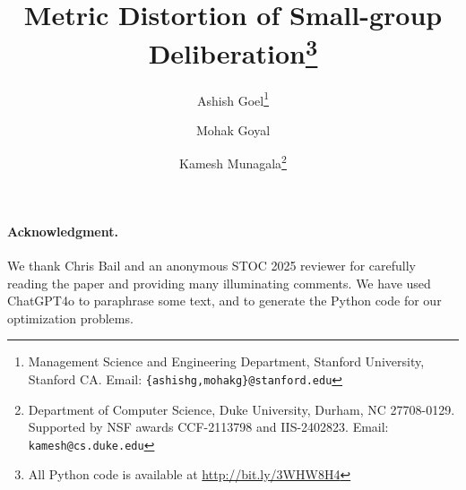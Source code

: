 \documentclass[11pt]{article}
\title{Metric Distortion of Small-group Deliberation\footnote{All Python code is available at \url{http://bit.ly/3WHW8H4}}}
\author{Ashish Goel\thanks{Management Science and Engineering Department, Stanford University, Stanford CA. Email: \texttt{\{ashishg,mohakg\}@stanford.edu}} \and Mohak Goyal\samethanks[1]  \and Kamesh Munagala\thanks{Department of Computer Science, Duke University, Durham, NC 27708-0129.  Supported by NSF awards CCF-2113798 and IIS-2402823. Email: \texttt{kamesh@cs.duke.edu}}}
\date{}
\begin{document}
\maketitle




\thispagestyle{empty}
\newpage
\setcounter{page}{1}













\paragraph{Acknowledgment.} We thank Chris Bail and an anonymous STOC 2025 reviewer for carefully reading the paper and providing many illuminating comments. We have used ChatGPT4o to paraphrase some text, and to generate the Python code for our optimization problems. 

\newpage


\end{document}
